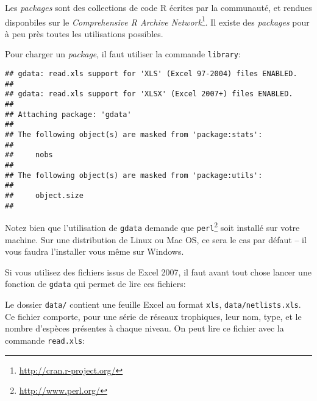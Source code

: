 \noindent Les \emph{packages} sont des collections de code R écrites par la communauté, et rendues disponbiles sur le \emph{Comprehensive R Archive Network}\footnote{\url{http://cran.r-project.org/}}.
Il existe des \emph{packages} pour à peu près toutes les utilisations possibles.

Pour charger un \emph{package}, il faut utiliser la commande \texttt{library}:

\begin{knitrout}
\color{fgcolor}\begin{kframe}
\begin{flushleft}
\ttfamily\noindent
{}\hlkeyword{(}\hlkeyword{)}\mbox{}
\normalfont
\end{flushleft}
\begin{verbatim}
## gdata: read.xls support for 'XLS' (Excel 97-2004) files ENABLED.
## 
## gdata: read.xls support for 'XLSX' (Excel 2007+) files ENABLED.
## 
## Attaching package: 'gdata'
## 
## The following object(s) are masked from 'package:stats':
## 
##     nobs
## 
## The following object(s) are masked from 'package:utils':
## 
##     object.size
## 
\end{verbatim}
\end{kframe}
\end{knitrout}


Notez bien que l'utilisation de \texttt{gdata} demande que \texttt{perl}\footnote{\url{http://www.perl.org/}} soit installé sur votre machine.
Sur une distribution de Linux ou Mac OS, ce sera le cas par défaut -- il vous faudra l'installer vous même sur Windows.

Si vous utilisez des fichiers issus de Excel 2007, il faut avant tout chose lancer une fonction de \texttt{gdata} qui permet de lire ces fichiers:

\begin{knitrout}
\color{fgcolor}\begin{kframe}
\begin{flushleft}
\ttfamily\noindent
{}\hlkeyword{(}\hlargument{=}{\ }\hlkeyword{,}{\ }\hlargument{=}{\ }\hlkeyword{)}\mbox{}
\normalfont
\end{flushleft}
\end{kframe}
\end{knitrout}


Le dossier \texttt{data/} contient une feuille Excel au format \texttt{xls}, \texttt{data/netlists.xls}. Ce fichier comporte, pour une série de réseaux trophiques, leur nom, type, et le nombre d'espèces présentes à chaque niveau.
On peut lire ce fichier avec la commande \texttt{read.xls}:


